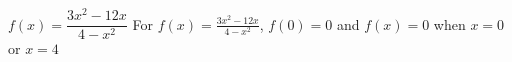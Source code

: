 {$f(x) = \dfrac{3x^2-12x}{4-x^2}$}
{For $f(x) =   \frac{3x^2-12x}{4-x^2}$, $f(0) =0$ and $f(x) = 0$ when $x=0$ or $x=4$}